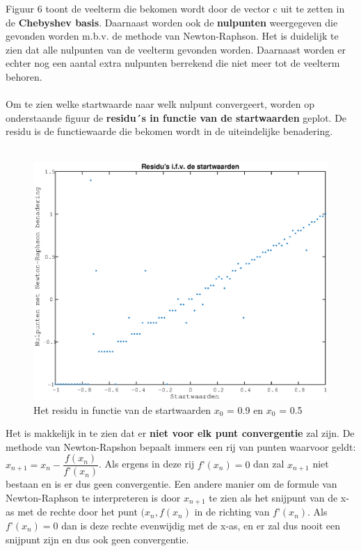 \documentclass{article}
\begin{document}
Figuur 6 toont de veelterm die bekomen wordt door de vector c uit te zetten in de \textbf{Chebyshev basis}. Daarnaast worden ook de \textbf{nulpunten} weergegeven die gevonden worden m.b.v. de methode van Newton-Raphson. Het is duidelijk te zien dat alle nulpunten van de veelterm gevonden worden. Daarnaast worden er echter nog een aantal extra nulpunten berrekend die niet meer tot de veelterm behoren.
\\ \\
Om te zien welke startwaarde naar welk nulpunt convergeert, worden op onderstaande figuur de \textbf{residu\'\ s in functie van de startwaarden} geplot. De residu is de functiewaarde die bekomen wordt in de uiteindelijke benadering.
\\ \\

\begin{figure}[H]
\includegraphics[width=0.75\columnwidth]{figuur_2}
\caption{Het residu in functie van de startwaarden $x_0$ = 0.9 en $x_0$ = 0.5} %
\end{figure}

Het is makkelijk in te zien dat er \textbf{niet voor elk punt convergentie} zal zijn. De methode van Newton-Rapshon bepaalt immers een rij van punten waarvoor geldt: $x_{n+1}=x_{n}-\dfrac{f(x_{n})}{f’(x_{n})}$. Als ergens in deze rij $f’(x_{n})=0$ dan zal $x_{n+1}$ niet bestaan en is er dus geen convergentie. Een andere manier om de formule van Newton-Raphson te interpreteren is door $x_{n+1}$ te zien als het snijpunt van de x-as met de rechte door het punt $(x_{n},f(x_{n})$ in de richting van $f’(x_{n})$. Als $f’(x_{n})=0$ dan is deze rechte evenwijdig met de x-as, en er zal dus nooit een snijpunt zijn en dus ook geen convergentie.

\clearpage
\end{document}
